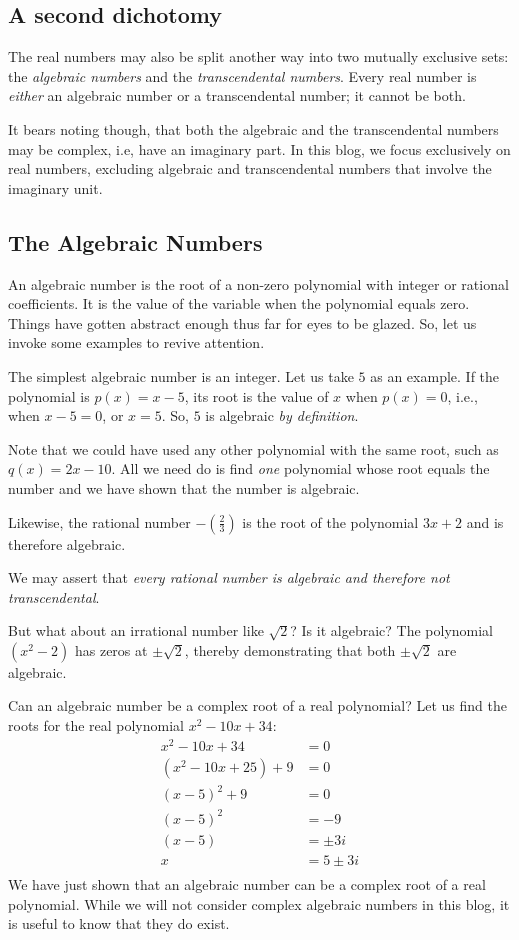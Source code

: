 \documentclass[
  a4paper,
]{article}
\begin{document}
\subsection{A second dichotomy}\label{a-second-dichotomy}

The real numbers may also be split another way into two mutually
exclusive sets: the \emph{algebraic numbers} and the
\emph{transcendental numbers}. Every real number is \emph{either} an
algebraic number or a transcendental number; it cannot be both.

It bears noting though, that both the algebraic and the transcendental
numbers may be complex, i.e, have an imaginary part. In this blog, we
focus exclusively on real numbers, excluding algebraic and
transcendental numbers that involve the imaginary unit.

\subsection{The Algebraic Numbers}\label{the-algebraic-numbers}

An algebraic number is the root of a non-zero polynomial with integer or
rational coefficients. It is the value of the variable when the
polynomial equals zero. Things have gotten abstract enough thus far for
eyes to be glazed. So, let us invoke some examples to revive attention.

The simplest algebraic number is an integer. Let us take \(5\) as an
example. If the polynomial is \(p(x) = x - 5\), its root is the value of
\(x\) when \(p(x) = 0\), i.e., when \(x - 5 = 0\), or \(x = 5\). So,
\(5\) is algebraic \emph{by definition}.

Note that we could have used any other polynomial with the same root,
such as \(q(x) = 2x - 10\). All we need do is find \emph{one} polynomial
whose root equals the number and we have shown that the number is
algebraic.

Likewise, the rational number \(-(\frac{2}{3})\) is the root of the
polynomial \(3x + 2\) and is therefore algebraic.

We may assert that \emph{every rational number is algebraic and
therefore not transcendental}.

But what about an irrational number like \(\sqrt{2}\)? Is it algebraic?
The polynomial \((x^2 - 2)\) has zeros at \(\pm\sqrt{2}\), thereby
demonstrating that both \(\pm\sqrt{2}\) are algebraic.

Can an algebraic number be a complex root of a real polynomial? Let us
find the roots for the real polynomial \(x^2 - 10x +34\): \[
\begin{aligned}
x^2 - 10x + 34 &= 0\\
(x^2 -10x + 25) + 9 &= 0\\
(x - 5)^2 + 9 &= 0\\
(x - 5)^2 &= -9\\
(x - 5) &= \pm3i\\
x &= 5 \pm 3i\\
\end{aligned}
\] We have just shown that an algebraic number can be a complex root of
a real polynomial. While we will not consider complex algebraic numbers
in this blog, it is useful to know that they do exist.
\end{document}
